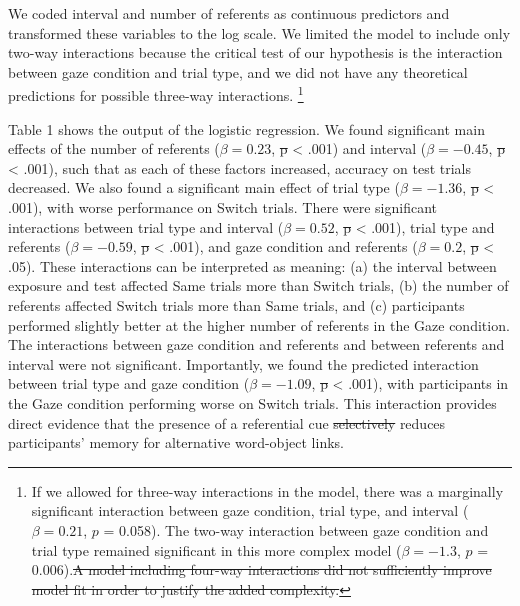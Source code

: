 \documentclass[authoryear, review]{elsarticle}
\providecommand{\DIFaddtex}[1]{{\protect\color{blue}\uwave{#1}}} %
\providecommand{\DIFdeltex}[1]{{\protect\color{red}\sout{#1}}}                      %
\providecommand{\DIFaddbegin}{} %
\providecommand{\DIFaddend}{} %
\providecommand{\DIFdelbegin}{} %
\providecommand{\DIFdelend}{} %
\providecommand{\DIFadd}[1]{\texorpdfstring{\DIFaddtex{#1}}{#1}} %
\providecommand{\DIFdel}[1]{\texorpdfstring{\DIFdeltex{#1}}{}} %
\begin{document}
We coded interval and number of referents as continuous predictors and
transformed these variables to the log scale. We limited the model to
include only two-way interactions because the critical test of our
hypothesis is the interaction between gaze condition and trial type, and
we did not have any theoretical predictions for possible three-way
interactions.
\footnote{If we allowed for three-way interactions in the model, there was a marginally significant interaction between gaze condition, trial type, and interval ($\beta = 0.21$, $p$ = 0.058). The two-way interaction between gaze condition and trial type remained significant in this more complex model ($\beta = -1.3$, $p$ = 0.006).\DIFdelbegin \DIFdel{A model including four-way interactions did not sufficiently improve model fit in order to justify the added complexity.}\DIFdelend }

Table 1 shows the output of the logistic regression. We found
significant main effects of the number of referents (\(\beta = 0.23\),
\DIFdelbegin \DIFdel{p
}\DIFdelend \DIFaddbegin \DIFadd{\(p\) }\DIFaddend \textless{} .001) and interval (\(\beta = -0.45\), \DIFdelbegin \DIFdel{p }\DIFdelend \DIFaddbegin \DIFadd{\(p\)
}\DIFaddend \textless{} .001), such that as each of these factors increased,
accuracy on test trials decreased. We also found a significant main
effect of trial type (\(\beta = -1.36\), \DIFdelbegin \DIFdel{p }\DIFdelend \DIFaddbegin \DIFadd{\(p\) }\DIFaddend \textless{} .001), with
worse performance on Switch trials. There were significant interactions
between trial type and interval (\(\beta = 0.52\), \DIFdelbegin \DIFdel{p }\DIFdelend \DIFaddbegin \DIFadd{\(p\) }\DIFaddend \textless{}
.001), trial type and referents (\(\beta = -0.59\), \DIFdelbegin \DIFdel{p }\DIFdelend \DIFaddbegin \DIFadd{\(p\) }\DIFaddend \textless{}
.001), and gaze condition and referents (\(\beta = 0.2\), \DIFdelbegin \DIFdel{p }\DIFdelend \DIFaddbegin \DIFadd{\(p\)
}\DIFaddend \textless{} .05). These interactions can be interpreted as meaning: (a)
the interval between exposure and test affected Same trials more than
Switch trials, (b) the number of referents affected Switch trials more
than Same trials, and (c) participants performed slightly better at the
higher number of referents in the Gaze condition. The interactions
between gaze condition and referents and between referents and interval
were not significant. Importantly, we found the predicted interaction
between trial type and gaze condition (\(\beta = -1.09\), \DIFdelbegin \DIFdel{p }\DIFdelend \DIFaddbegin \DIFadd{\(p\)
}\DIFaddend \textless{} .001), with participants in the Gaze condition performing
worse on Switch trials. This interaction provides direct evidence that
the presence of a referential cue \DIFdelbegin \DIFdel{selectively }\DIFdelend reduces participants' memory for
alternative word-object links.
\end{document}
